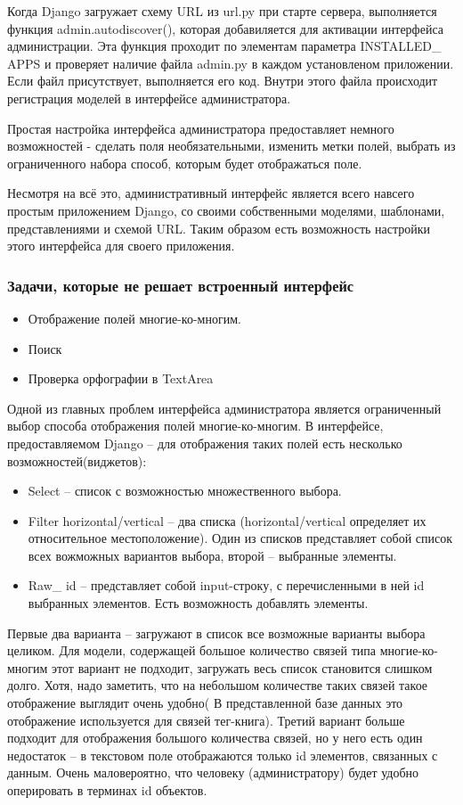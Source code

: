 \documentclass[a4paper]{report}
\begin{document}
Когда Django загружает схему URL из url.py  при старте сервера, выполняется функция admin.autodiscover(), которая добавиляется для активации интерфейса администрации. Эта функция проходит по элементам параметра INSTALLED\_ APPS и проверяет наличие файла admin.py в каждом установленом приложении. Если файл присутствует, выполняется его код. Внутри этого файла происходит регистрация моделей в интерфейсе администратора. %

Простая настройка интерфейса администратора предоставляет немного возможностей - сделать поля необязательными, изменить метки полей, выбрать из ограниченного набора способ, которым будет отображаться поле.

Несмотря на всё это, административный интерфейс является всего навсего простым приложением Django, со своими собственными моделями, шаблонами, представлениями и схемой URL. Таким образом есть возможность настройки этого интерфейса для своего приложения.

\subsubsection{Задачи, которые не решает встроенный интерфейс}
\begin{itemize}
	\item Отображение полей многие-ко-многим.
	\item Поиск
	\item Проверка орфографии в TextArea
\end{itemize}

Одной из главных проблем интерфейса администратора является ограниченный выбор способа отображения полей многие-ко-многим. В интерфейсе, предоставляемом Django -- для отображения таких полей есть несколько возможностей(виджетов):
\begin{itemize}
	\item Select -- список с возможностью множественного выбора.
	\item Filter horizontal/vertical -- два списка (horizontal/vertical определяет их относительное местоположение). Один из списков представляет собой список всех вожможных вариантов выбора, второй -- выбранные элементы.
	\item Raw\_ id -- представляет собой input-строку, с перечисленными в ней id выбранных элементов. Есть возможность добавлять элементы.
\end{itemize}
Первые два варианта -- загружают в список все возможные варианты выбора целиком. Для модели, содержащей большое количество связей типа многие-ко-многим этот вариант не подходит, \tk загружать весь список становится слишком долго. Хотя, надо заметить, что на небольшом количестве таких связей такое отображение выглядит очень удобно( В представленной базе данных это отображение используется для связей тег-книга). 
Третий вариант больше подходит для отображения большого количества связей, но у него есть один недостаток -- в текстовом поле отображаются только id элементов, связанных с данным. Очень маловероятно, что человеку (администратору) будет удобно оперировать в терминах id объектов.
\end{document}
